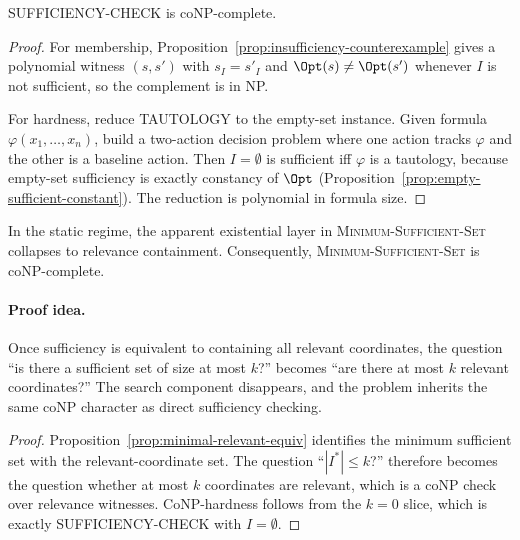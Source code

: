 \begin{theorem}\label{thm:sufficiency-conp}
SUFFICIENCY-CHECK is coNP-complete.
\end{theorem}


\begin{proof}
For membership, Proposition~\ref{prop:insufficiency-counterexample} gives a polynomial witness $(s,s')$ with $s_I=s'_I$ and $\Opt(s)\ne\Opt(s')$ whenever $I$ is not sufficient, so the complement is in NP.

For hardness, reduce TAUTOLOGY to the empty-set instance. Given formula $\varphi(x_1,\ldots,x_n)$, build a two-action decision problem where one action tracks $\varphi$ and the other is a baseline action. Then $I=\emptyset$ is sufficient iff $\varphi$ is a tautology, because empty-set sufficiency is exactly constancy of $\Opt$ (Proposition~\ref{prop:empty-sufficient-constant}). The reduction is polynomial in formula size.
\end{proof}

\begin{theorem}\label{thm:minsuff-conp}
In the static regime, the apparent existential layer in \textsc{Minimum-Sufficient-Set} collapses to relevance containment. Consequently, \textsc{Minimum-Sufficient-Set} is coNP-complete.
\end{theorem}


\paragraph{Proof idea.}
Once sufficiency is equivalent to containing all relevant coordinates, the question ``is there a sufficient set of size at most $k$?'' becomes ``are there at most $k$ relevant coordinates?'' The search component disappears, and the problem inherits the same coNP character as direct sufficiency checking.

\begin{proof}
Proposition~\ref{prop:minimal-relevant-equiv} identifies the minimum sufficient set with the relevant-coordinate set. The question ``$|I^*|\le k$?'' therefore becomes the question whether at most $k$ coordinates are relevant, which is a coNP check over relevance witnesses. CoNP-hardness follows from the $k=0$ slice, which is exactly SUFFICIENCY-CHECK with $I=\emptyset$.
\end{proof}


